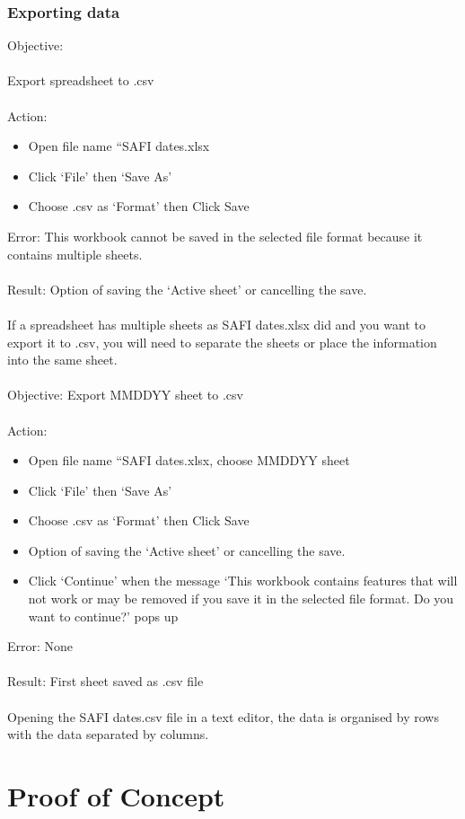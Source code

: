\documentclass{article}
\begin{document}
\subsubsection*{Exporting data}
Objective:\\\\
Export spreadsheet to .csv\\\\
Action:
\begin{itemize}
\item Open file name “SAFI dates.xlsx
\item Click ‘File’ then ‘Save As’
\item Choose .csv as ‘Format’ then Click Save
\end{itemize}
Error: This workbook cannot be saved in the selected file format because it contains multiple sheets.\\\\
Result: Option of saving the ‘Active sheet’ or cancelling the save.\\\\
If a spreadsheet has multiple sheets as SAFI dates.xlsx did and you want to export it to .csv, you will need to separate the sheets or place the information into the same sheet.\\\\
Objective: Export MMDDYY sheet to .csv\\\\
Action:
\begin{itemize}
\item Open file name “SAFI dates.xlsx, choose MMDDYY sheet
\item Click ‘File’ then ‘Save As’
\item Choose .csv as ‘Format’ then Click Save
\item Option of saving the ‘Active sheet’ or cancelling the save.
\item Click ‘Continue’ when the message ‘This workbook contains features that will not work or may be removed if you save it in the selected file format. Do you want to continue?’ pops up
\end{itemize}
Error: None\\\\
Result: First sheet saved as .csv file\\\\
Opening the SAFI dates.csv file in a text editor, the data is organised by rows with the data separated by columns.
\section{Proof of Concept}
\end{document}
